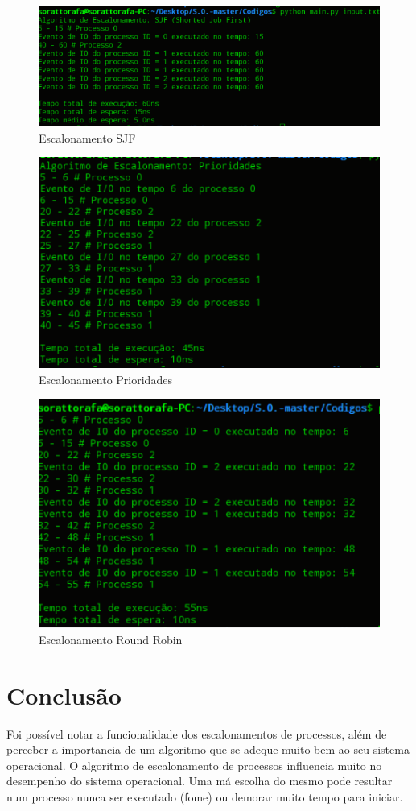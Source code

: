 \documentclass[times, 10pt,twocolumn]{article}
\begin{document}
\begin{figure}[H]
	\centering
	\includegraphics[width=.5\textwidth]{figuras/sjf}
	\caption{Escalonamento SJF}
	\label{fig:figura-002}
\end{figure}  


\begin{figure}[H]
	\centering
	\includegraphics[width=.4\textwidth]{figuras/priori}
	\caption{Escalonamento Prioridades}
	\label{fig:figura-003}
\end{figure} 

\begin{figure}[H]
	\centering
	\includegraphics[width=.4\textwidth]{figuras/rr}
	\caption{Escalonamento Round Robin}
	\label{fig:figura-004}
\end{figure}









\section{Conclusão}
    Foi possível notar a funcionalidade dos escalonamentos de processos, além de perceber a importancia de um algoritmo que se adeque muito bem ao seu sistema operacional. O algoritmo de escalonamento de processos influencia muito no desempenho do sistema operacional. Uma má escolha do mesmo pode resultar num processo nunca ser executado (fome) ou demorar muito tempo para iniciar.
    
\end{document}
